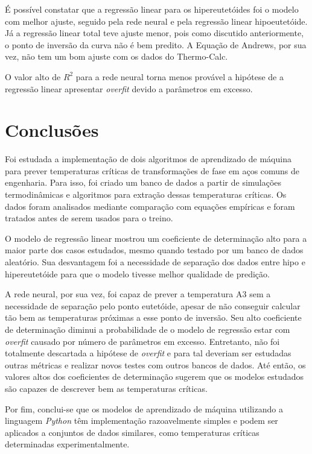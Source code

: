 \documentclass[brazil,tf,epusp]{usp}  %
\begin{document}
É possível constatar que a regressão linear para os hipereutetóides foi o modelo com melhor ajuste, seguido pela rede neural e pela regressão linear hipoeutetóide. Já a regressão linear total teve ajuste menor, pois como discutido anteriormente, o ponto de inversão da curva não é bem predito. A Equação de Andrews, por sua vez, não tem um bom ajuste com os dados do Thermo-Calc\textregistered{}.

O valor alto de $R^{2}$ para a rede neural torna menos provável a hipótese de a regressão linear apresentar \textit{overfit} devido a parâmetros em excesso.

\chapter{Conclusões}

Foi estudada a implementação de dois algoritmos de aprendizado de máquina para prever temperaturas críticas de transformações de fase em aços comuns de engenharia. Para isso, foi criado um banco de dados a partir de simulações termodinâmicas e algoritmos para extração dessas temperaturas críticas. Os dados foram analisados mediante comparação com equações empíricas e foram tratados antes de serem usados para o treino.

O modelo de regressão linear mostrou um coeficiente de determinação alto para a maior parte dos casos estudados, mesmo quando testado por um banco de dados aleatório. Sua desvantagem foi a necessidade de separação dos dados entre hipo e hipereutetóide para que o modelo tivesse melhor qualidade de predição.

A rede neural, por sua vez, foi capaz de prever a temperatura A3 sem a necessidade de separação pelo ponto eutetóide, apesar de não conseguir calcular tão bem as temperaturas próximas a esse ponto de inversão. Seu alto coeficiente de determinação diminui a probabilidade de o modelo de regressão estar com \textit{overfit} causado por número de parâmetros em excesso. Entretanto, não foi totalmente descartada a hipótese de \textit{overfit} e para tal deveriam ser estudadas outras métricas e realizar novos testes com outros bancos de dados. Até então, os valores altos dos coeficientes de determinação sugerem que os modelos estudados são capazes de descrever bem as temperaturas críticas.

Por fim, conclui-se que os modelos de aprendizado de máquina utilizando a linguagem \textit{Python} têm implementação razoavelmente simples e podem ser aplicados a conjuntos de dados similares, como temperaturas críticas determinadas experimentalmente.
\end{document}
